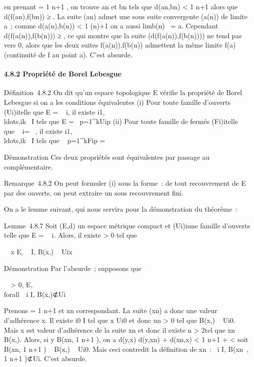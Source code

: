 en prenant \eta = 1 \over n+1 , on trouve an
et bn tels que d(an,bn) \textless{} 1
\over n+1 alors que d(f(an),f(bn))
≥ \epsilon. La suite (an) admet une sous suite convergente
(a\phi(n)) de limite a~; comme d(a\phi(n),b\phi(n))
\textless{} 1 \over \phi(n)+1 on a aussi
limb\phi(n)~ = a. Cependant
d(f(a\phi(n)),f(b\phi(n))) ≥ \epsilon, ce qui montre que la suite
(d(f(a\phi(n)),f(b\phi(n)))) ne tend pas vers 0, alors que
les deux suites f(a\phi(n)),f(b\phi(n)) admettent la même
limite f(a) (continuité de f au point a). C'est absurde.

\paragraph{4.8.2 Propriété de Borel Lebesgue}

Définition~4.8.2 On dit qu'un espace topologique E vérifie la propriété
de Borel Lebesgue si on a les conditions équivalentes (i) Pour toute
famille d'ouverts (Ui)i\inI telle que E
= \⋃ ~
i\inIUi, il existe
i1,\\ldots,ik~
\in I tels que E =\ \⋃
 p=1^kUip (ii) Pour toute famille
de fermés (Fi)i\inI telle que
\⋂ ~
i\inIFi = \varnothing~, il existe
i1,\\ldots,ik~
\in I tels que \⋂ ~
p=1^kFip = \varnothing~

Démonstration Ces deux propriétés sont équivalentes par passage au
complémentaire.

Remarque~4.8.2 On peut formuler (i) sous la forme~: de tout recouvrement
de E par des ouverts, on peut extraire un sous recouvrement fini.

On a le lemme suivant, qui nous servira pour la démonstration du
théorème~:

Lemme~4.8.7 Soit (E,d) un espace métrique compact et
(Ui)i\inI une famille d'ouverts telle que E
= \⋃ ~
i\inIUi. Alors, il existe \epsilon \textgreater{} 0 tel que

\forall~~x \in E,
\existsix~ \in I, B(x,\epsilon) \subset~
Uix

Démonstration Par l'absurde~; supposons que

\forall~~\epsilon \textgreater{} 0,
\existsx \in E, \\forall~~i \in I,
B(x,\epsilon)⊄Ui

Prenons \epsilon = 1 \over n+1 et xn
correspondant. La suite (xn) a donc une valeur d'adhérence x.
Il existe i0 \in I tel que x \in Ui0 et donc
un \eta \textgreater{} 0 tel que B(x,\eta) \subset~ Ui0. Mais x
est valeur d'adhérence de la suite xn et donc il existe n
\textgreater{} 2\diagup\eta tel que xn \in B(x,\eta{}). Alors, si y \in
B(xn, 1 \over n+1 ), on a d(y,x) \leq
d(y,xn) + d(xn,x) \textless{} 1
\over n+1 + \eta {} \textless{} \eta
soit B(xn, 1 \over n+1 ) \subset~ B(x,\eta) \subset~
Ui0. Mais ceci contredit la définition de
xn~: \forall~i \in I, B(xn~, 1
\over n+1 )⊄Ui. C'est absurde.

